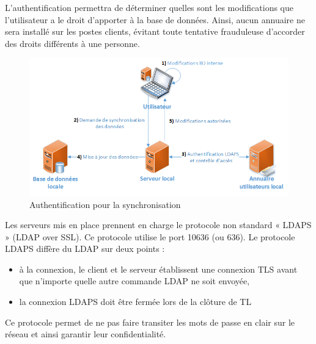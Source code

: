 \documentclass[11pt,fleqn]{report}
\begin{document}
L’authentification permettra de déterminer quelles sont les modifications que l’utilisateur a le droit d’apporter à la base de données. Ainsi, aucun annuaire ne sera installé sur les postes clients, évitant toute tentative frauduleuse d’accorder des droits différents à une personne.
\begin{figure}[htbp]
	\centering
	\includegraphics[scale=0.9]{Images/SchemaAuthentification.png}
	\caption{Authentification pour la synchronisation}
	\label{SchemaAuthentification}
\end{figure}

Les serveurs mis en place prennent en charge le protocole non standard « LDAPS » (LDAP over SSL). Ce protocole utilise le port 10636 (ou 636). Le protocole LDAPS diffère du LDAP sur deux points :
\begin{itemize}
\item à la connexion, le client et le serveur établissent une connexion TLS avant que n'importe quelle autre commande LDAP ne soit envoyée,
\item la connexion LDAPS doit être fermée lors de la clôture de TL
\end{itemize}

Ce protocole permet de ne pas faire transiter les mots de passe en clair sur le réseau et ainsi garantir leur confidentialité.
\end{document}
